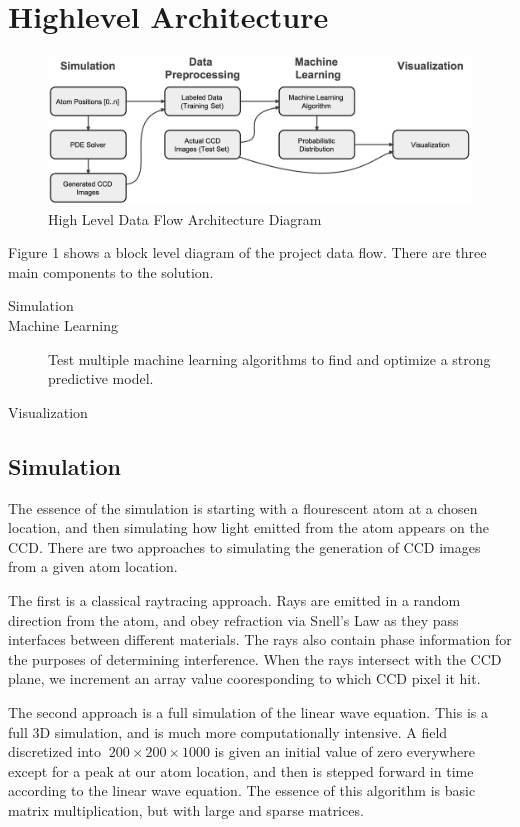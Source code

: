 \section{Highlevel Architecture}
\label{architecture}

\begin{figure}[h]
\begin{center}
\includegraphics[scale=0.4]{arch.png}
\caption{High Level Data Flow Architecture Diagram}
\label{fig:arch}
\end{center}
\end{figure}

\noindent Figure 1 shows a block level diagram of the project data flow. There are three main components to the solution.
\begin{description}
\item[Simulation] 
\item[Machine Learning] Test multiple machine learning algorithms to find and optimize a strong predictive model.
\item[Visualization]
\end{description}

\subsection{Simulation}
The essence of the simulation is starting with a flourescent atom at a chosen location, and then simulating how light emitted from the atom appears on the CCD. There are two approaches to simulating the generation of CCD images from a given atom location.

The first is a classical raytracing approach. Rays are emitted in a random direction from the atom, and obey refraction via Snell's Law as they pass interfaces between different materials. The rays also contain phase information for the purposes of determining interference. When the rays intersect with the CCD plane, we increment an array value cooresponding to which CCD pixel it hit.

The second approach is a full simulation of the linear wave equation. This is a full 3D simulation, and is much more computationally intensive. A field discretized into $~200\times 200\times 1000$ is given an initial value of zero everywhere except for a peak at our atom location, and then is stepped forward in time according to the linear wave equation. The essence of this algorithm is basic matrix multiplication, but with large and sparse matrices.

